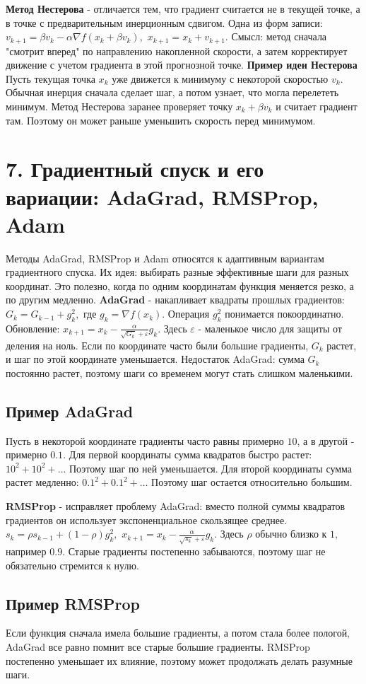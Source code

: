 \documentclass[12pt,a4paper]{article}
\begin{document}
\textbf{Метод Нестерова} - отличается тем, что градиент считается не в текущей точке, а в точке с предварительным инерционным сдвигом.
Одна из форм записи: $v_{k+1}=\beta v_k-\alpha \nabla f(x_k+\beta v_k),$ $x_{k+1}=x_k+v_{k+1}.$
Смысл: метод сначала "смотрит вперед" по направлению накопленной скорости, а затем корректирует движение с учетом градиента в этой прогнозной точке.
\textbf{Пример идеи Нестерова}
Пусть текущая точка $x_k$ уже движется к минимуму с некоторой скоростью $v_k$. Обычная инерция сначала сделает шаг, а потом узнает, что могла перелететь минимум.
Метод Нестерова заранее проверяет точку $x_k+\beta v_k$
и считает градиент там. Поэтому он может раньше уменьшить скорость перед минимумом.
\section{7. Градиентный спуск и его вариации: AdaGrad, RMSProp, Adam}
Методы AdaGrad, RMSProp и Adam относятся к адаптивным вариантам градиентного спуска. Их идея: выбирать разные эффективные шаги для разных координат.
Это полезно, когда по одним координатам функция меняется резко, а по другим медленно.
\textbf{AdaGrad} - накапливает квадраты прошлых градиентов: $G_k=G_{k-1}+g_k^2,$
где $g_k=\nabla f(x_k).$
Операция $g_k^2$ понимается покоординатно.
Обновление: $x_{k+1}=x_k-\frac{\alpha}{\sqrt{G_k}+\varepsilon}g_k.$
Здесь $\varepsilon$ - маленькое число для защиты от деления на ноль.
Если по координате часто были большие градиенты, $G_k$ растет, и шаг по этой координате уменьшается.
Недостаток AdaGrad: сумма $G_k$ постоянно растет, поэтому шаги со временем могут стать слишком маленькими.
\subsection{Пример AdaGrad}
Пусть в некоторой координате градиенты часто равны примерно $10$, а в другой - примерно $0.1$.
Для первой координаты сумма квадратов быстро растет: $10^2+10^2+\ldots$
Поэтому шаг по ней уменьшается.
Для второй координаты сумма растет медленно: $0.1^2+0.1^2+\ldots$
Поэтому шаг остается относительно большим.

\textbf{RMSProp} - исправляет проблему AdaGrad: вместо полной суммы квадратов градиентов он использует экспоненциальное скользящее среднее. $s_k=\rho s_{k-1}+(1-\rho)g_k^2,$ $x_{k+1}=x_k-\frac{\alpha}{\sqrt{s_k}+\varepsilon}g_k.$
Здесь $\rho$ обычно близко к $1$, например $0.9$.
Старые градиенты постепенно забываются, поэтому шаг не обязательно стремится к нулю.
\subsection{Пример RMSProp}
Если функция сначала имела большие градиенты, а потом стала более пологой, AdaGrad все равно помнит все старые большие градиенты. RMSProp постепенно уменьшает их влияние, поэтому может продолжать делать разумные шаги.
\end{document}

